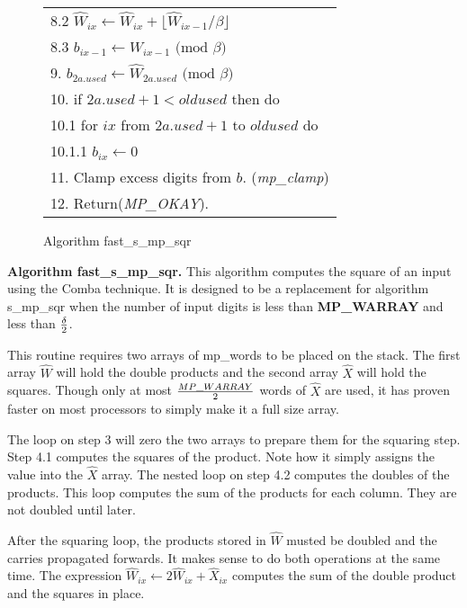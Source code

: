 \documentclass[b5paper]{book}
\begin{document}
\begin{figure}[!here]
\begin{small}
\begin{center}
\begin{tabular}{l}
\hspace{3mm}8.2 $\hat W_{ix} \leftarrow \hat W_{ix} + \lfloor \hat W_{ix - 1} / \beta \rfloor$ \\
\hspace{3mm}8.3 $b_{ix-1} \leftarrow W_{ix-1} \mbox{ (mod }\beta\mbox{)}$ \\
9.  $b_{2a.used} \leftarrow \hat W_{2a.used} \mbox{ (mod }\beta\mbox{)}$ \\
10.  if $2a.used + 1 < oldused$ then do \\
\hspace{3mm}10.1  for $ix$ from $2a.used + 1$ to $oldused$ do \\
\hspace{6mm}10.1.1  $b_{ix} \leftarrow 0$ \\
11.  Clamp excess digits from $b$.  (\textit{mp\_clamp}) \\
12.  Return(\textit{MP\_OKAY}). \\ 
\hline
\end{tabular}
\end{center}
\end{small}
\caption{Algorithm fast\_s\_mp\_sqr}
\end{figure}

\textbf{Algorithm fast\_s\_mp\_sqr.}
This algorithm computes the square of an input using the Comba technique.  It is designed to be a replacement for algorithm s\_mp\_sqr when
the number of input digits is less than \textbf{MP\_WARRAY} and less than $\delta \over 2$.  

This routine requires two arrays of mp\_words to be placed on the stack.  The first array $\hat W$ will hold the double products and the second
array $\hat X$ will hold the squares.  Though only at most $MP\_WARRAY \over 2$ words of $\hat X$ are used, it has proven faster on most 
processors to simply make it a full size array.

The loop on step 3 will zero the two arrays to prepare them for the squaring step.  Step 4.1 computes the squares of the product.  Note how 
it simply assigns the value into the $\hat X$ array.  The nested loop on step 4.2 computes the doubles of the products.  This loop
computes the sum of the products for each column.  They are not doubled until later.

After the squaring loop, the products stored in $\hat W$ musted be doubled and the carries propagated forwards.  It makes sense to do both
operations at the same time.  The expression $\hat W_{ix} \leftarrow 2 \hat W_{ix} + \hat {X}_{ix}$ computes the sum of the double product and the
squares in place.  
\end{document}
